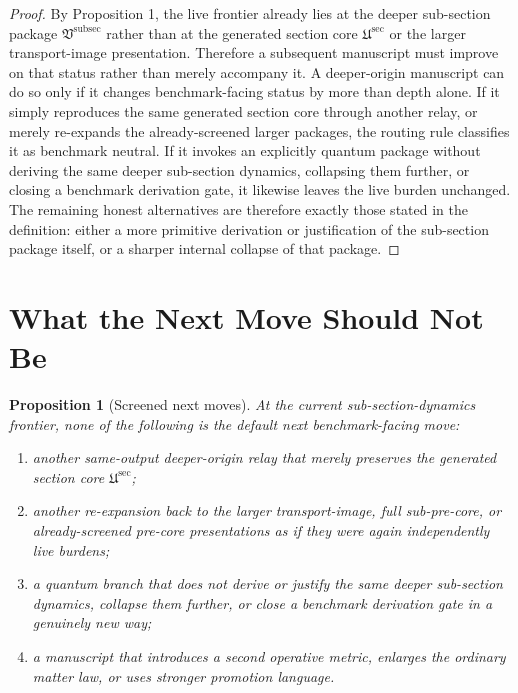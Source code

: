 \documentclass[11pt]{article}
\newcommand{\SubPreSectionCore}{\mathfrak U^{\mathrm{sec}}}
\newcommand{\SubSectionPackage}{\mathfrak V^{\mathrm{subsec}}}
\newtheorem{proposition}{Proposition}
\begin{document}
\begin{proof}
By Proposition 1, the live frontier already lies at the deeper sub-section package \(\SubSectionPackage\) rather than at the generated section core \(\SubPreSectionCore\) or the larger transport-image presentation. Therefore a subsequent manuscript must improve on that status rather than merely accompany it. A deeper-origin manuscript can do so only if it changes benchmark-facing status by more than depth alone. If it simply reproduces the same generated section core through another relay, or merely re-expands the already-screened larger packages, the routing rule classifies it as benchmark neutral. If it invokes an explicitly quantum package without deriving the same deeper sub-section dynamics, collapsing them further, or closing a benchmark derivation gate, it likewise leaves the live burden unchanged. The remaining honest alternatives are therefore exactly those stated in the definition: either a more primitive derivation or justification of the sub-section package itself, or a sharper internal collapse of that package.
\end{proof}

\section{What the Next Move Should Not Be}

\begin{proposition}[Screened next moves]
At the current sub-section-dynamics frontier, none of the following is the default next benchmark-facing move:
\begin{enumerate}
    \item another same-output deeper-origin relay that merely preserves the generated section core \(\SubPreSectionCore\);
    \item another re-expansion back to the larger transport-image, full sub-pre-core, or already-screened pre-core presentations as if they were again independently live burdens;
    \item a quantum branch that does not derive or justify the same deeper sub-section dynamics, collapse them further, or close a benchmark derivation gate in a genuinely new way;
    \item a manuscript that introduces a second operative metric, enlarges the ordinary matter law, or uses stronger promotion language.
\end{enumerate}
\end{proposition}
\end{document}
